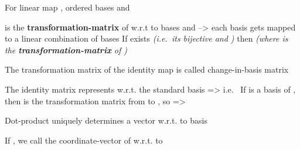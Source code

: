 For linear map , ordered bases
and

\begin{itemize}

      \vItem
             is the
            \textbf{transformation-matrix} of  w.r.t to bases 
            and 
      \vItem
            --> each  basis gets mapped to a
            linear combination of  bases
      \vItem
            If  exists \emph{(i.e.~its bijective and )}
            then 
            \emph{(where  is the
                  \textbf{transformation-matrix} of )}
\end{itemize}

\hSep %

The transformation matrix of the identity map is called
change-in-basis matrix

\begin{itemize}

      \vItem
            The identity matrix  represents
             w.r.t. the standard
            basis
            => i.e.~
      \vItem
            If 
            is a basis of , then
             is
            the transformation matrix from  to 
      \vItem
            , so =>
\end{itemize}

\hSep %

Dot-product uniquely determines a vector w.r.t. to basis
\begin{itemize}

      \vItem
            If , we call  the
            coordinate-vector of  w.r.t. to 
\end{itemize}

